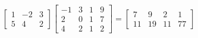 %
\begin{equation*}
\begin{bmatrix}
1 & -2 & 3\\
5 & 4 & 2
\end{bmatrix}
%
\begin{bmatrix}
-1 & 3 & 1 & 9 \\
 2 & 0 & 1 & 7 \\
 4 & 2 & 1 & 2
\end{bmatrix}
=
\begin{bmatrix}
 7 & 9 & 2 & 1 \\
 11 & 19 & 11 & 77
\end{bmatrix}
\end{equation*}
%